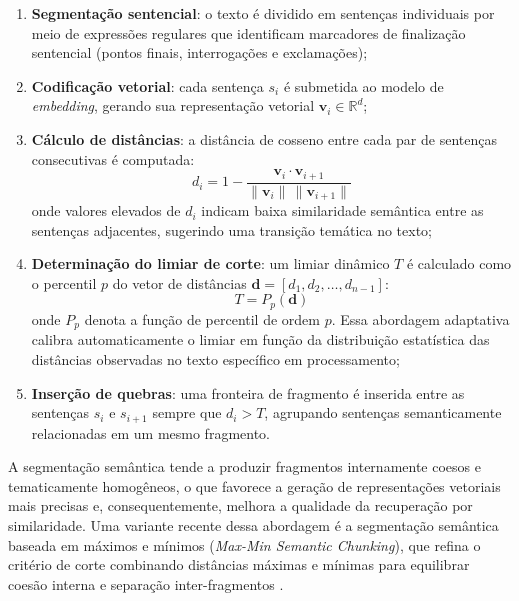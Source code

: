 \documentclass[
	12pt,				%
	openright,			%
	oneside,			%
	a4paper,			%
	tccpreliminar,		%
	]{ABNT-DC-UEL}
\begin{document}
\begin{enumerate}
    \item \textbf{Segmentação sentencial}: o texto é dividido em sentenças individuais por meio de expressões regulares que identificam marcadores de finalização sentencial (pontos finais, interrogações e exclamações);
    
    \item \textbf{Codificação vetorial}: cada sentença $s_i$ é submetida ao modelo de \textit{embedding}, gerando sua representação vetorial $\mathbf{v}_i \in \mathbb{R}^d$;
    
    \item \textbf{Cálculo de distâncias}: a distância de cosseno entre cada par de sentenças consecutivas é computada:
    \begin{equation}
      d_i = 1 - \frac{\mathbf{v}_i \cdot \mathbf{v}_{i+1}}{\|\mathbf{v}_i\|\,\|\mathbf{v}_{i+1}\|}
    \end{equation}
    \noindent onde valores elevados de $d_i$ indicam baixa similaridade semântica entre as sentenças adjacentes, sugerindo uma transição temática no texto;
    
    \item \textbf{Determinação do limiar de corte}: um limiar dinâmico $T$ é calculado como o percentil $p$ do vetor de distâncias $\mathbf{d} = [d_1, d_2, \ldots, d_{n-1}]$:
    \begin{equation}
      T = P_p(\mathbf{d})
    \end{equation}
    \noindent onde $P_p$ denota a função de percentil de ordem $p$. Essa abordagem adaptativa calibra automaticamente o limiar em função da distribuição estatística das distâncias observadas no texto específico em processamento;
    
    \item \textbf{Inserção de quebras}: uma fronteira de fragmento é inserida entre as sentenças $s_i$ e $s_{i+1}$ sempre que $d_i > T$, agrupando sentenças semanticamente relacionadas em um mesmo fragmento.
\end{enumerate}

A segmentação semântica tende a produzir fragmentos internamente coesos e tematicamente homogêneos, o que favorece a geração de representações vetoriais mais precisas e, consequentemente, melhora a qualidade da recuperação por similaridade. Uma variante recente dessa abordagem é a segmentação semântica baseada em máximos e mínimos (\textit{Max-Min Semantic Chunking}), que refina o critério de corte combinando distâncias máximas e mínimas para equilibrar coesão interna e separação inter-fragmentos \cite{semantic2025maxmin}.
\end{document}
